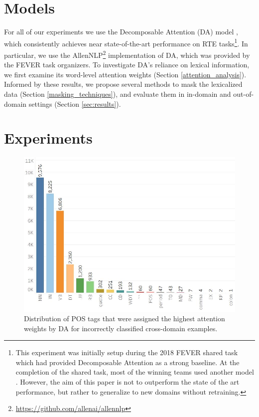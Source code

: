 \section{Models}

For all of our experiments we use the Decomposable Attention (DA) model \citep{parikh2016decomposable}, which consistently achieves near state-of-the-art performance on RTE tasks\footnote{This experiment was initially setup during the 2018 FEVER shared task which had provided Decomposable Attention as a strong baseline. At the completion of the shared task, most of the winning teams used another model \citep{chen2016enhanced}. However, the aim of this paper is not to outperform the state of the art performance, but rather to generalize to new domains without retraining.}. In particular, we use the AllenNLP\footnote{\url{https://github.com/allenai/allennlp}}
implementation of DA, which was provided by the FEVER task organizers. To investigate DA's reliance on lexical information, we first examine its word-level attention weights (Section \ref{attention_analysis}).
Informed by these results, we propose several methods to mask the lexicalized data (Section \ref{masking_techniques}), and evaluate them in in-domain and  out-of-domain settings (Section \ref{sec:results}).



\section{Experiments} 


\begin{figure}
 \includegraphics[width=0.95\linewidth]{mainmatter/emnlp2019_delex/histogram_2.jpeg}
    \vspace{-3mm}
    \caption{ Distribution of POS tags that were assigned the highest attention weights by DA for incorrectly classified cross-domain examples.}
  \label{fig:attention}
\vspace{-6mm}
\end{figure}



